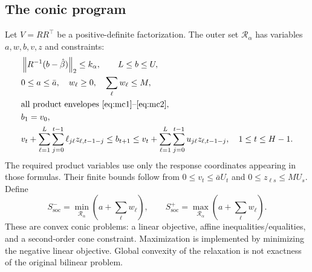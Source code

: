 \documentclass[11pt,a4paper]{article}
\theoremstyle{definition}\newtheorem{definition}[theorem]{Definition}
\theoremstyle{remark}\newtheorem{remark}[theorem]{Remark}
\newcommand{\norm}[1]{\left\lVert#1\right\rVert}
\newcommand{\mc}{\mathcal}
\begin{document}
\subsection{The conic program}
Let $V=RR^\top$ be a positive-definite factorization. The outer set $\mc R_\alpha$ has variables $a,w,b,v,z$ and constraints:
\begin{align}
 &\norm{R^{-1}(b-\hat\beta)}_2\le k_\alpha,\qquad L\le b\le U,\label{eq:soc}\\
 &0\le a\le\bar a,\quad w_\ell\ge0,\quad\sum_\ell w_\ell\le M,\label{eq:linear-bounds}\\
 &\text{all product envelopes \eqref{eq:mc1}--\eqref{eq:mc2}},\nonumber\\
 &b_1=v_0,\label{eq:first-lag}\\
 &v_t+\sum_{\ell=1}^L\sum_{j=0}^{t-1}\ell_{j\ell}z_{\ell,t-1-j}
 \le b_{t+1}\le
 v_t+\sum_{\ell=1}^L\sum_{j=0}^{t-1}u_{j\ell}z_{\ell,t-1-j},
 \quad1\le t\le H-1.\label{eq:outer-rec}
\end{align}
The required product variables use only the response coordinates appearing in those formulas. Their finite bounds follow from $0\le v_t\le\bar a U_t$ and $0\le z_{\ell s}\le M U_s$.
Define
\begin{equation}
 S_{\mathrm{soc}}^- =\min_{\mc R_\alpha}\left(a+\sum_\ell w_\ell\right),\qquad
 S_{\mathrm{soc}}^+ =\max_{\mc R_\alpha}\left(a+\sum_\ell w_\ell\right).
 \label{eq:soc-ends}
\end{equation}
These are convex conic problems: a linear objective, affine inequalities/equalities, and a second-order cone constraint. Maximization is implemented by minimizing the negative linear objective. Global convexity of the relaxation is not exactness of the original bilinear problem.
\end{document}
